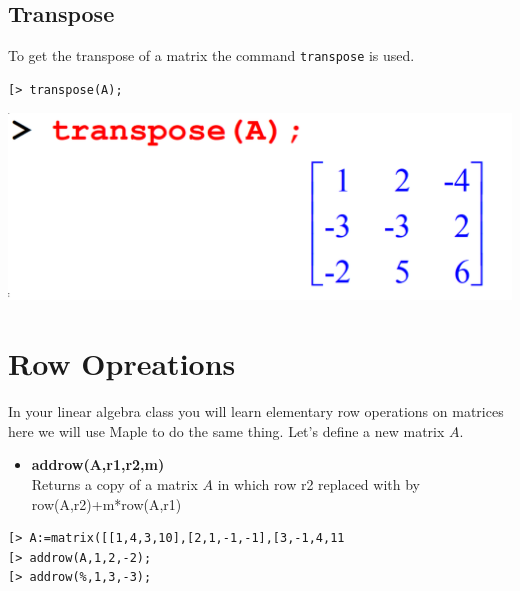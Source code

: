 \documentclass[
]{book}
\providecommand{\tightlist}{%
  \setlength{\itemsep}{0pt}\setlength{\parskip}{0pt}}
\theoremstyle{definition}
\theoremstyle{definition}
\theoremstyle{definition}
\theoremstyle{definition}
\theoremstyle{remark}
\begin{document}
\subsection{Transpose}\label{transpose}

To get the transpose of a matrix the command \texttt{transpose} is used.

\begin{verbatim}
[> transpose(A);
\end{verbatim}

\includegraphics{figures/Lesson 4/fig27.png}

\section{Row Opreations}\label{row-opreations}

In your linear algebra class you will learn elementary row operations on matrices here we will use Maple to do the same thing.
Let's define a new matrix \(A\).

\begin{itemize}
\tightlist
\item
  \textbf{addrow(A,r1,r2,m)}\\
  Returns a copy of a matrix \(A\) in which row r2 replaced with by row(A,r2)+m*row(A,r1)
\end{itemize}

\begin{verbatim}
[> A:=matrix([[1,4,3,10],[2,1,-1,-1],[3,-1,4,11
[> addrow(A,1,2,-2);
[> addrow(%,1,3,-3);
\end{verbatim}
\end{document}
